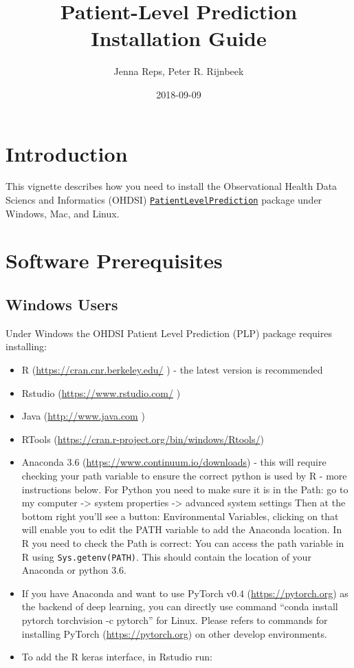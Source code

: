 \documentclass[]{article}
\title{Patient-Level Prediction Installation Guide}
\author{Jenna Reps, Peter R. Rijnbeek}
\date{2018-09-09}
\providecommand{\tightlist}{%
  \setlength{\itemsep}{0pt}\setlength{\parskip}{0pt}}
\begin{document}
\maketitle

{
\setcounter{tocdepth}{2}
\tableofcontents
}
\section{Introduction}\label{introduction}

This vignette describes how you need to install the Observational Health
Data Sciencs and Informatics (OHDSI)
\href{http://github.com/OHDSI/PatientLevelPrediction}{\texttt{PatientLevelPrediction}}
package under Windows, Mac, and Linux.

\section{Software Prerequisites}\label{software-prerequisites}

\subsection{Windows Users}\label{windows-users}

Under Windows the OHDSI Patient Level Prediction (PLP) package requires
installing:

\begin{itemize}
\tightlist
\item
  R (\url{https://cran.cnr.berkeley.edu/} ) - the latest version is
  recommended
\item
  Rstudio (\url{https://www.rstudio.com/} )
\item
  Java (\url{http://www.java.com} )
\item
  RTools (\url{https://cran.r-project.org/bin/windows/Rtools/})
\item
  Anaconda 3.6 (\url{https://www.continuum.io/downloads}) - this will
  require checking your path variable to ensure the correct python is
  used by R - more instructions below. For Python you need to make sure
  it is in the Path: go to my computer -\textgreater{} system properties
  -\textgreater{} advanced system settings Then at the bottom right
  you'll see a button: Environmental Variables, clicking on that will
  enable you to edit the PATH variable to add the Anaconda location. In
  R you need to check the Path is correct: You can access the path
  variable in R using
  \texttt{Sys.getenv(\textquotesingle{}PATH\textquotesingle{})}. This
  should contain the location of your Anaconda or python 3.6.
\item
  If you have Anaconda and want to use PyTorch v0.4
  (\url{https://pytorch.org}) as the backend of deep learning, you can
  directly use command ``conda install pytorch torchvision -c pytorch''
  for Linux. Please refers to commands for installing PyTorch
  (\url{https://pytorch.org}) on other develop environments.
\item
  To add the R keras interface, in Rstudio run:
\end{itemize}
\end{document}
